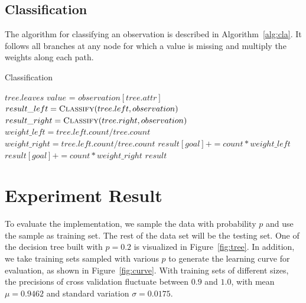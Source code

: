 \documentclass{article}
\begin{document}
\subsection{Classification}

The algorithm for classifying an observation is described in Algorithm~\ref{alg:cla}. It follows all branches at any node for which a value is missing and multiply the weights along each path.

\begin{algorithm}[H]
\centering
\caption{Classification}
\label{alg:cla}
  \begin{algorithmic}[1]
    		\State\Return $tree.leaves$
    	\EndIf
    	\State $value$ = $observation[tree.attr]$
    		\State $result\_left =  \Call{Classify}{tree.left, observation}$
    		\State $result\_right =  \Call{Classify}{tree.right, observation}$
    		\State $weight\_left = tree.left.count/tree.count$
    		\State $weight\_right = tree.left.count/tree.count$
    			\State$result[goal] += count * weight\_left$
    		\EndFor
    			\State$result[goal] += count * weight\_right$
    		\EndFor
    		\State \Return $result$
    	\Else
    			\State \Return {}
    		\Else
    			\State \Return {}
    		\EndIf
    	\EndIf
    \EndFunction
  \end{algorithmic}
\end{algorithm}

\section{Experiment Result}

To evaluate the implementation, we sample the data with probability $p$ and use the sample as training set. The rest of the data set will be the testing set. One of the decision tree built with $p = 0.2$ is visualized in Figure~\ref{fig:tree}. In addition, we take training sets sampled with various $p$ to generate the learning curve for evaluation, as shown in Figure~\ref{fig:curve}. With training sets of different sizes, the precisions of cross validation fluctuate between $0.9$ and $1.0$, with mean $\mu = 0.9462$ and standard variation $\sigma = 0.0175$.
\end{document}
